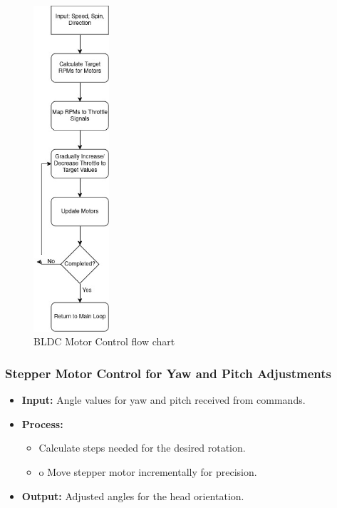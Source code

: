 \documentclass[12pt]{article}
\begin{document}
\begin{figure}[H]
    \centering
    \includegraphics[width=0.25\textwidth]{CH5 figureler/salih figureler/BLDC Motor Control flow chart.jpg}
    \caption{BLDC Motor Control flow chart}
    \label{fig:BLDC motor control flow chart}
\end{figure}

\subsubsection{Stepper Motor Control for Yaw and Pitch Adjustments}
\begin{itemize}
    \item \textbf{Input:} Angle values for yaw and pitch received from commands.
    \item  \textbf{Process:}
    \begin{itemize}
        \item Calculate steps needed for the desired rotation.
        \item o	Move stepper motor incrementally for precision.
    \end{itemize}
    \item \textbf{Output:} Adjusted angles for the head orientation.
\end{itemize}
\end{document}
